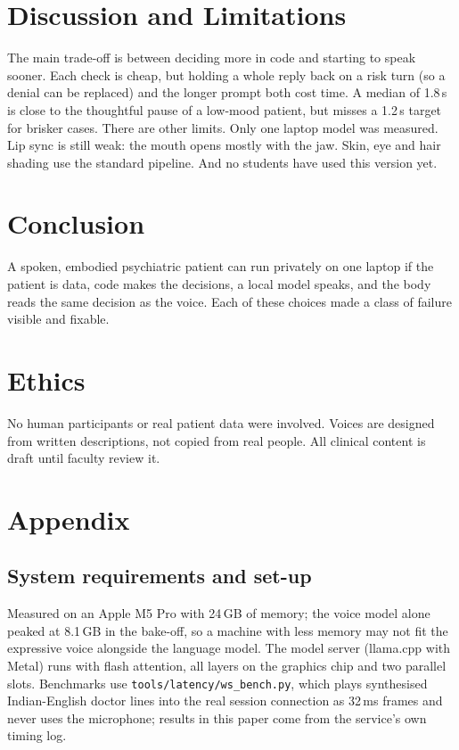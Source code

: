\documentclass{article}
\begin{document}
\section{Discussion and Limitations}
The main trade-off is between deciding more in code and starting to speak sooner. Each check is cheap, but holding a whole reply back on a risk
turn (so a denial can be replaced) and the longer prompt both cost time. A median of 1.8\,s is close to the thoughtful pause of a low-mood
patient, but misses a 1.2\,s target for brisker cases. There are other limits. Only one laptop model was measured. Lip sync is still weak: the mouth opens mostly with the jaw. Skin, eye and hair shading use the standard pipeline. And no students have used this version yet.

\section{Conclusion}
A spoken, embodied psychiatric patient can run privately on one laptop if the patient is data, code makes the decisions, a local model speaks, and
the body reads the same decision as the voice. Each of these choices made a class of failure visible and fixable.

\section*{Ethics}
No human participants or real patient data were involved. Voices are designed from written descriptions, not copied from real people. All clinical
content is draft until faculty review it.
\section*{Appendix}
\subsection*{System requirements and set-up}
Measured on an Apple M5 Pro with 24\,GB of memory; the voice model alone peaked at 8.1\,GB in the bake-off, so a machine with less
memory may not fit the expressive voice alongside the language model. The model server (llama.cpp with Metal) runs with flash attention,
all layers on the graphics chip and two parallel slots. Benchmarks use \texttt{tools/latency/ws\_bench.py}, which plays synthesised Indian-English doctor lines
into the real session connection as 32\,ms frames and never uses the microphone; results in this paper come from the service's own timing log.
\end{document}
